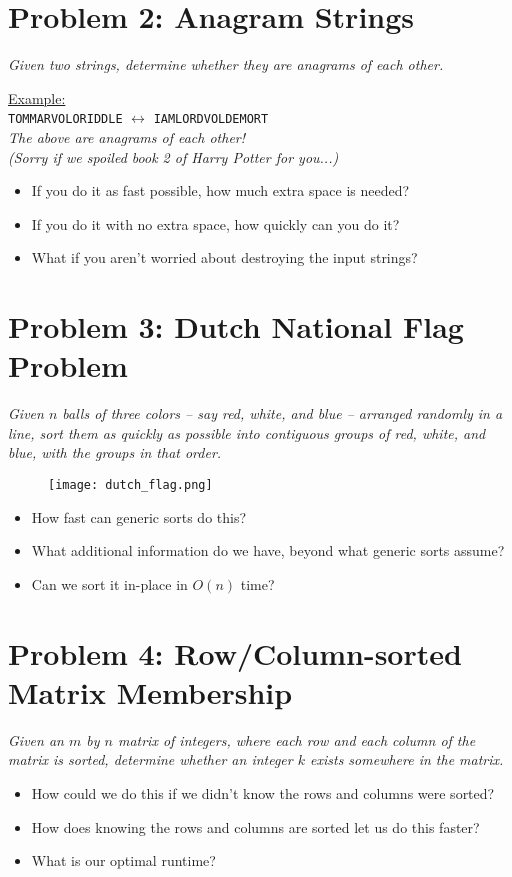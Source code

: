 \section*{Problem 2: Anagram Strings}
\textit{Given two strings, determine whether they are anagrams of each other.}

\begin{center}
    \uline{Example:}\\

    \texttt{TOMMARVOLORIDDLE} $\longleftrightarrow$ \texttt{IAMLORDVOLDEMORT}\\

    \textit{The above are anagrams of each other!\\ (Sorry if we spoiled book 2 of Harry Potter for you...)}
\end{center}

\begin{itemize}
    \item If you do it as fast possible, how much extra space is needed?
    \item If you do it with no extra space, how quickly can you do it?
    \item What if you aren't worried about destroying the input strings?
\end{itemize}

\section*{Problem 3: Dutch National Flag Problem}
\textit{Given $n$ balls of three colors – say red, white, and blue – arranged randomly in a line, sort them as quickly as possible into contiguous groups of red, white, and blue, with the groups in that order.}

\begin{figure}[h]
    \centering
    \texttt{[image: dutch\_flag.png]}
\end{figure}

\begin{itemize}
    \item How fast can generic sorts do this?
    \item What additional information do we have, beyond what generic sorts assume?
    \item Can we sort it in-place in $O(n)$ time?
\end{itemize}

\section*{Problem 4: Row/Column-sorted Matrix Membership}
\textit{Given an $m$ by $n$ matrix of integers, where each row and each column of the matrix is sorted, determine whether an integer $k$ exists somewhere in the matrix.}
\begin{itemize}
    \item How could we do this if we didn't know the rows and columns were sorted?
    \item How does knowing the rows and columns are sorted let us do this faster?
    \item What is our optimal runtime?
\end{itemize}
    
